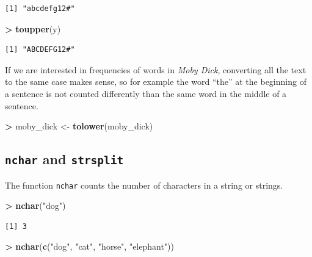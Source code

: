 \documentclass[
]{krantz}
\makeatletter
\newenvironment{Shaded}{\begin{snugshade}}{\end{snugshade}}
\newcommand{\KeywordTok}[1]{\textcolor[rgb]{0.27,0.27,0.27}{\textbf{#1}}}
\newcommand{\NormalTok}[1]{#1}
\newcommand{\OperatorTok}[1]{\textcolor[rgb]{0.43,0.43,0.43}{\textbf{#1}}}
\newcommand{\StringTok}[1]{\textcolor[rgb]{0.5,0.5,0.5}{#1}}
\newenvironment{kframe}{%
\medskip{}
\setlength{\fboxsep}{.8em}
 \def\at@end@of@kframe{}%
 \ifinner\ifhmode%
  \def\at@end@of@kframe{\end{minipage}}%
  \begin{minipage}{\columnwidth}%
 \fi\fi%
 \def\FrameCommand##1{\hskip\@totalleftmargin \hskip-\fboxsep
 \colorbox{shadecolor}{##1}\hskip-\fboxsep
     \hskip-\linewidth \hskip-\@totalleftmargin \hskip\columnwidth}%
 \MakeFramed {\advance\hsize-\width
   \@totalleftmargin\z@ \linewidth\hsize
   \@setminipage}}%
 {\par\unskip\endMakeFramed%
 \at@end@of@kframe}
\renewenvironment{Shaded}{\begin{kframe}}{\end{kframe}}
\makeatother
\begin{document}
\begin{verbatim}
[1] "abcdefg12#"
\end{verbatim}

\begin{Shaded}
\begin{Highlighting}[]
\OperatorTok{\textgreater{}}\StringTok{ }\KeywordTok{toupper}\NormalTok{(y)}
\end{Highlighting}
\end{Shaded}

\begin{verbatim}
[1] "ABCDEFG12#"
\end{verbatim}

If we are interested in frequencies of words in \emph{Moby Dick}, converting all the text to the same case makes sense, so for example the word ``the'' at the beginning of a sentence is not counted differently than the same word in the middle of a sentence.

\begin{Shaded}
\begin{Highlighting}[]
\OperatorTok{\textgreater{}}\StringTok{ }\NormalTok{moby\_dick \textless{}{-}}\StringTok{ }\KeywordTok{tolower}\NormalTok{(moby\_dick)}
\end{Highlighting}
\end{Shaded}

\hypertarget{nchar-and-strsplit}{%
\subsection{\texorpdfstring{\texttt{nchar} and \texttt{strsplit}}{nchar and strsplit}}\label{nchar-and-strsplit}}

The function \texttt{nchar} counts the number of characters in a string or strings.

\begin{Shaded}
\begin{Highlighting}[]
\OperatorTok{\textgreater{}}\StringTok{ }\KeywordTok{nchar}\NormalTok{(}\StringTok{"dog"}\NormalTok{)}
\end{Highlighting}
\end{Shaded}

\begin{verbatim}
[1] 3
\end{verbatim}

\begin{Shaded}
\begin{Highlighting}[]
\OperatorTok{\textgreater{}}\StringTok{ }\KeywordTok{nchar}\NormalTok{(}\KeywordTok{c}\NormalTok{(}\StringTok{"dog"}\NormalTok{, }\StringTok{"cat"}\NormalTok{, }\StringTok{"horse"}\NormalTok{, }\StringTok{"elephant"}\NormalTok{))}
\end{Highlighting}
\end{Shaded}
\end{document}
